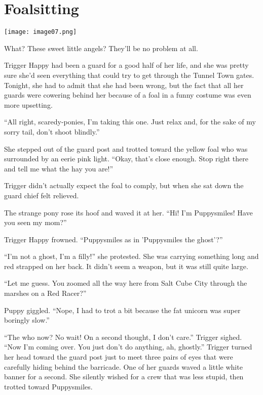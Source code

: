 
\chapter{Foalsitting}

\texttt{[image: image07.png]}

\begin{intro}
What? These sweet little angels? They'll be no problem at all.
\end{intro}



Trigger Happy had been a guard for a good half of her life, and she was pretty sure she'd seen everything that could try to get through the Tunnel Town gates. Tonight, she had to admit that she had been wrong, but the fact that all her guards were cowering behind her because of a foal in a funny costume was even more upsetting.

``All right, scaredy-ponies, I'm taking this one. Just relax and, for the sake of my sorry tail, don't shoot blindly.''

She stepped out of the guard post and trotted toward the yellow foal who was surrounded by an eerie pink light. ``Okay, that's close enough. Stop right there and tell me what the hay you are!''

Trigger didn't actually expect the foal to comply, but when she sat down the guard chief felt relieved.

The strange pony rose its hoof and waved it at her. ``Hi! I'm Puppysmiles! Have you seen my mom?''

Trigger Happy frowned. ``Puppysmiles as in 'Puppysmiles the ghost'?''

``I'm not a ghost, I'm a filly!'' she protested. She was carrying something long and red strapped on her back. It didn't seem a weapon, but it was still quite large.

``Let me guess. You zoomed all the way here from Salt Cube City through the marshes on a Red Racer?''

Puppy giggled. ``Nope, I had to trot a bit because the fat unicorn was super boringly slow.''

``The who now? No wait! On a second thought, I don't care.'' Trigger sighed. ``Now I'm coming over. You just don't do anything, ah, ghostly.'' Trigger turned her head toward the guard post just to meet three pairs of eyes that were carefully hiding behind the barricade. One of her guards waved a little white banner for a second. She silently wished for a crew that was less stupid, then trotted toward Puppysmiles.

